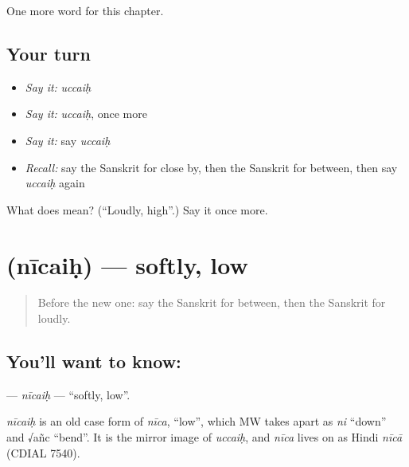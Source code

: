 \begin{grammarlens}[title={What you've built}]
One more word for this chapter.
\end{grammarlens}

\subsection*{Your turn}
\begin{itemize}
\raggedright
  \item \emph{Say it:} \emph{uccaiḥ}
  \item \emph{Say it:} \emph{uccaiḥ}, once more
  \item \emph{Say it:} say \emph{uccaiḥ}
  \item \emph{Recall:} say the Sanskrit for close by, then the Sanskrit for between, then say \emph{uccaiḥ} again
\end{itemize}

\begin{tcolorbox}[breakable,colback=teal!4,colframe=teal!35!black,title={Before you move on}]
What does  mean? (\textquotedblleft{}Loudly, high\textquotedblright{}.) Say it once more.
\end{tcolorbox}
\section[\texorpdfstring{\sk{नीचैः} (nīcaiḥ)}{नीचैः (nīcaiḥ)}]{ (nīcaiḥ) — softly, low}

\label{lesson:SA-C184-nicaih}



\begin{quote}
Before the new one: say the Sanskrit for between, then the Sanskrit for loudly.
\end{quote}

\subsection*{You'll want to know: }
\textbf{} — \emph{nīcaiḥ} — \textquotedblleft{}softly, low\textquotedblright{}.

\begin{cousinweb}
\emph{nīcaiḥ} is an old case form of \emph{nīca}, \textquotedblleft{}low\textquotedblright{}, which MW takes apart as \emph{ni} \textquotedblleft{}down\textquotedblright{} and √añc \textquotedblleft{}bend\textquotedblright{}. It is the mirror image of \emph{uccaiḥ}, and \emph{nīca} lives on as Hindi \emph{nīcā} (CDIAL 7540).
\end{cousinweb}

